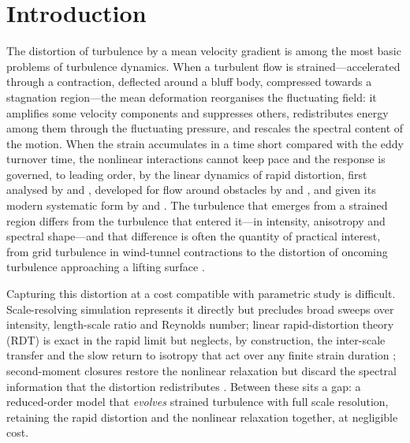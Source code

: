 \documentclass[lineno]{JFM-FLM_Au}
\begin{document}
\section{Introduction}\label{sec:intro}
The distortion of turbulence by a mean velocity gradient is among the
most basic problems of turbulence dynamics. When a turbulent flow is
strained---accelerated through a contraction, deflected around a bluff
body, compressed towards a stagnation region---the mean deformation
reorganises the fluctuating field: it amplifies some velocity components
and suppresses others, redistributes energy among them through the
fluctuating pressure, and rescales the spectral content of the motion.
When the strain accumulates in a time short compared with the eddy
turnover time, the nonlinear interactions cannot keep pace and the
response is governed, to leading order, by the linear dynamics of rapid
distortion, first analysed by \citet{BatchelorProudman1954} and
\citet{TownsendBook1976}, developed for flow around obstacles by
\citet{Hunt1973} and \citet{HuntGraham1978}, and given its modern
systematic form by \citet{HuntCarruthers1990} and
\citet{SagautCambon2018}. The turbulence that emerges from a strained
region differs from the turbulence that entered it---in intensity,
anisotropy and spectral shape---and that difference is often the
quantity of practical interest, from grid turbulence in wind-tunnel
contractions \citep{MillsCorrsin1959,TuckerReynolds1968,LeeReynolds1985}
to the distortion of oncoming turbulence approaching a lifting surface
\citep{HuntGraham1978,GoldsteinAtassi1976}.

Capturing this distortion at a cost compatible with parametric study is
difficult. Scale-resolving simulation represents it directly but
precludes broad sweeps over intensity, length-scale ratio and Reynolds
number; linear rapid-distortion theory (RDT) is exact in the rapid limit
but neglects, by construction, the inter-scale transfer and the slow
return to isotropy that act over any finite strain duration
\citep{SagautCambon2018}; second-moment closures restore the nonlinear
relaxation but discard the spectral information that the distortion
redistributes \citep{LaunderReeceRodi1975,Pope2000}. Between these sits
a gap: a reduced-order model that \emph{evolves} strained turbulence
with full scale resolution, retaining the rapid distortion and the
nonlinear relaxation together, at negligible cost.
\end{document}
